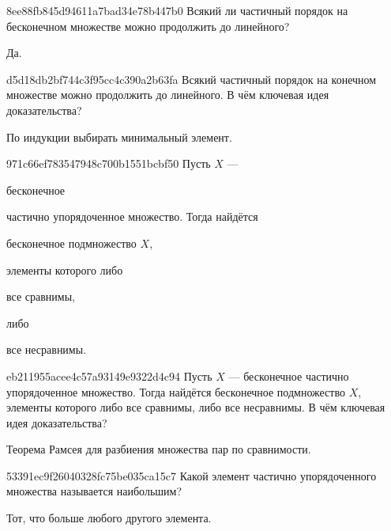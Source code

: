 \begin{note}{8ee88fb845d94611a7bad34e78b447b0}
    Всякий ли частичный порядок на бесконечном множестве можно продолжить до линейного?

    \begin{cloze}{1}
        Да.
    \end{cloze}
\end{note}

\begin{note}{d5d18db2bf744c3f95cc4c390a2b63fa}
    Всякий частичный порядок на конечном множестве можно продолжить до линейного.
    В чём ключевая идея доказательства?

    \begin{cloze}{1}
        По индукции выбирать минимальный элемент.
    \end{cloze}
\end{note}

\begin{note}{971c66ef783547948c700b1551bcbf50}
    Пусть \({ X }\) --- \begin{icloze}{3}бесконечное\end{icloze} частично упорядоченное множество.
    Тогда найдётся \begin{icloze}{2}бесконечное подмножество \({ X }\),\end{icloze} элементы которого либо \begin{icloze}{1}все сравнимы,\end{icloze} либо \begin{icloze}{2}все несравнимы.\end{icloze}
\end{note}

\begin{note}{eb211955acee4c57a93149e9322d4c94}
    Пусть \({ X }\) --- бесконечное частично упорядоченное множество.
    Тогда найдётся бесконечное подмножество \({ X }\), элементы которого либо все сравнимы, либо все несравнимы.
    В чём ключевая идея доказательства?

    \begin{cloze}{1}
        Теорема Рамсея для разбиения множества пар по сравнимости.
    \end{cloze}
\end{note}

\begin{note}{53391ec9f26040328fc75be035ca15c7}
    Какой элемент частично упорядоченного множества называется наибольшим?

    \begin{cloze}{1}
        Тот, что больше любого другого элемента.
    \end{cloze}
\end{note}


